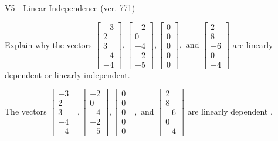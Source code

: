 \begin{exercise}
  \begin{exerciseTitle}V5 - Linear Independence (ver. 771)\end{exerciseTitle}
  \begin{exerciseStatement}
    Explain why the vectors \(\left[\begin{array}{r}
-3 \\
2 \\
3 \\
-4 \\
-4
\end{array}\right] , \left[\begin{array}{r}
-2 \\
0 \\
-4 \\
-2 \\
-5
\end{array}\right] , \left[\begin{array}{r}
0 \\
0 \\
0 \\
0 \\
0
\end{array}\right] , \text{ and } \left[\begin{array}{r}
2 \\
8 \\
-6 \\
0 \\
-4
\end{array}\right]\) are linearly dependent or linearly independent.	


  \end{exerciseStatement}
  \begin{exerciseAnswer}
   The vectors \(\left[\begin{array}{r}
-3 \\
2 \\
3 \\
-4 \\
-4
\end{array}\right] , \left[\begin{array}{r}
-2 \\
0 \\
-4 \\
-2 \\
-5
\end{array}\right] , \left[\begin{array}{r}
0 \\
0 \\
0 \\
0 \\
0
\end{array}\right] , \text{ and } \left[\begin{array}{r}
2 \\
8 \\
-6 \\
0 \\
-4
\end{array}\right]\) are 
  	 linearly dependent  .
  


  \end{exerciseAnswer}
\end{exercise}